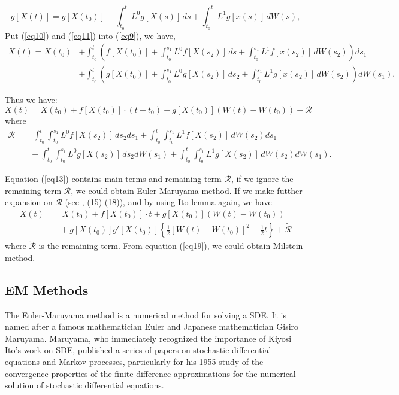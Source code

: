 \documentclass[12pt,a4paper]{article}
\theoremstyle{definition}
\begin{document}
\begin{equation}
    \label{eq11}g[X(t)]=g[X(t_0)]+\int_{t_0}^t L^0 g[X(s)]\,ds+\int_{t_0}^t L^1 g[x(s)]\, dW(s),
\end{equation}
Put (\ref{eq10}) and (\ref{eq11}) into (\ref{eq9}), we have, \begin{align}
    X(t)=X(t_0) &+\int_{t_0}^t\left(f[X(t_0)]+\int_{t_0}^{s_1} L^0 f[X(s_2)]\,ds+\int_{t_0}^{s_1} L^1 f[x(s_2)]\, dW(s_2) \right) ds_1 \nonumber \\
    &+ \int_{t_0}^t\left(g[X(t_0)]+\int_{t_0}^{s_1} L^0 g[X(s_2)]\,ds_2+\int_{t_0}^{s_1} L^1 g[x(s_2)]\, dW(s_2) \right) dW(s_1).
\end{align}

Thus we have:
\begin{equation}
    \label{eq13}X(t)=X(t_0)+f[X(t_0)]\cdot (t-t_0)+g[X(t_0)](W(t)-W(t_0))+\mathcal{R}
\end{equation}
where \begin{align}
    \mathcal{R}&= \int_{t_0}^t\int_{t_0}^{s_1} L^0f[X(s_2)]\, ds_2ds_1+ \int_{t_0}^t\int_{t_0}^{s_1} L^1f[X(s_2)]\, dW(s_2)ds_1 \nonumber \\
    &\quad +\int_{t_0}^t\int_{t_0}^{s_1} L^0g[X(s_2)]\, ds_2dW(s_1)+ \int_{t_0}^t\int_{t_0}^{s_1} L^1g[X(s_2)]\, dW(s_2)dW(s_1).
\end{align}

Equation (\ref{eq13}) contains main terms and remaining term $\mathcal{R}$, if we ignore the remaining term $\mathcal{R}$, we could obtain Euler-Maruyama method. If we make futther expansion on $\mathcal{R}$ (see \cite{bayram}, (15)-(18)), and by using Ito lemma again, we have \begin{align}
    X(t)& = X(t_0)+f[X(t_0)]\cdot t+g[X(t_0)](W(t)-W(t_0))\nonumber \\
    &\quad + g[X(t_0)]g'[X(t_0)]\left\{ \frac{1}{2}[W(t)-W(t_0)]^2 -\frac{1}{2}t\right\}+\tilde{\mathcal{R}} \label{eq19}
\end{align} 
where $\tilde{\mathcal{R}}$ is the remaining term. From equation (\ref{eq19}), we could obtain Milstein method.

\subsection{EM Methods}
The Euler-Maruyama method is a numerical method for solving a SDE. It is named after a famous mathematician Euler and Japanese mathematician Gisiro Maruyama. Maruyama, who immediately recognized the importance of Kiyosi Ito's work on SDE, published a series of papers on stochastic differential equations and Markov processes, particularly for his 1955 study of the convergence properties of the finite-difference approximations for the numerical solution of stochastic differential equations. 
\end{document}
